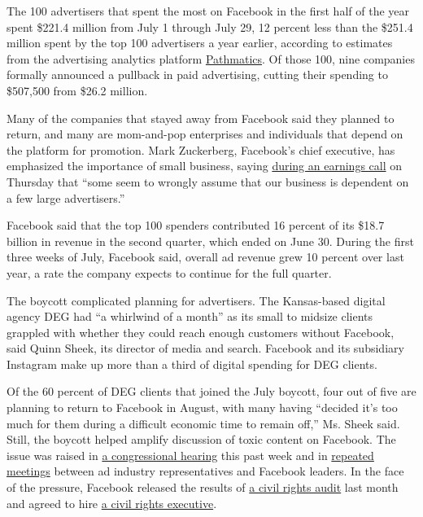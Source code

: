 The 100 advertisers that spent the most on Facebook in the first half of
the year spent \$221.4 million from July 1 through July 29, 12 percent
less than the \$251.4 million spent by the top 100 advertisers a year
earlier, according to estimates from the advertising analytics platform
\href{https://www.pathmatics.com/product/methodology}{Pathmatics}. Of
those 100, nine companies formally announced a pullback in paid
advertising, cutting their spending to \$507,500 from \$26.2 million.

Many of the companies that stayed away from Facebook said they planned
to return, and many are mom-and-pop enterprises and individuals that
depend on the platform for promotion. Mark Zuckerberg, Facebook's chief
executive, has emphasized the importance of small business, saying
\href{https://www.nytimes.com/live/2020/07/30/business/stock-market-today-coronavirus\#facebook-nearly-doubles-its-profit-but-warns-of-fallout-from-ad-boycottshttps://www.nytimes.com/2020/07/30/technology/tech-company-earnings-amazon-apple-facebook-google.html}{during
an earnings call} on Thursday that ``some seem to wrongly assume that
our business is dependent on a few large advertisers.''

Facebook said that the top 100 spenders contributed 16 percent of its
\$18.7 billion in revenue in the second quarter, which ended on June 30.
During the first three weeks of July, Facebook said, overall ad revenue
grew 10 percent over last year, a rate the company expects to continue
for the full quarter.

The boycott complicated planning for advertisers. The Kansas-based
digital agency DEG had ``a whirlwind of a month'' as its small to
midsize clients grappled with whether they could reach enough customers
without Facebook, said Quinn Sheek, its director of media and search.
Facebook and its subsidiary Instagram make up more than a third of
digital spending for DEG clients.

Of the 60 percent of DEG clients that joined the July boycott, four out
of five are planning to return to Facebook in August, with many having
``decided it's too much for them during a difficult economic time to
remain off,'' Ms. Sheek said. Still, the boycott helped amplify
discussion of toxic content on Facebook. The issue was raised in
\href{https://www.nytimes.com/2020/07/29/technology/big-tech-hearing-apple-amazon-facebook-google.html}{a
congressional hearing} this past week and in
\href{https://www.nytimes.com/2020/06/23/business/media/facebook-ad-boycott.html}{repeated
meetings} between ad industry representatives and Facebook leaders. In
the face of the pressure, Facebook released the results of
\href{https://www.nytimes.com/2020/07/08/technology/facebook-civil-rights-audit.html}{a
civil rights audit} last month and agreed to hire
\href{https://www.nytimes.com/2020/07/07/technology/facebook-ad-boycott-civil-rights.html}{a
civil rights executive}.

